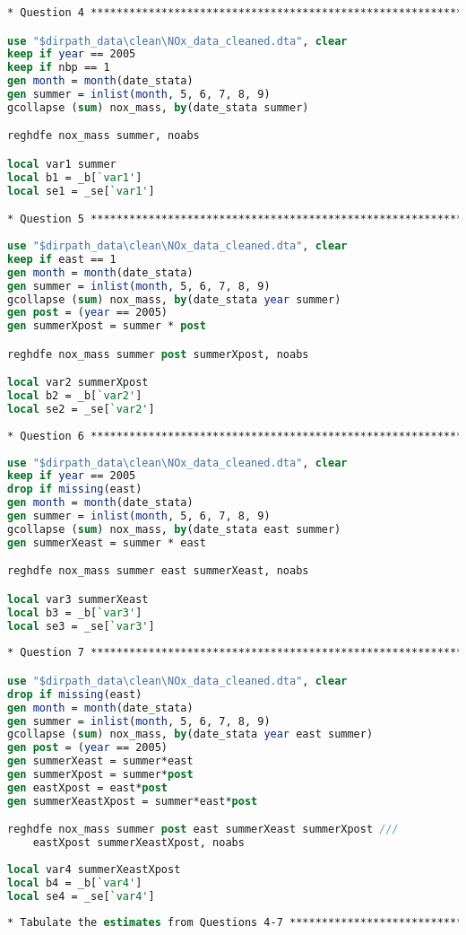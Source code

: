 \documentclass[12pt]{article}
\begin{document}
\begin{lstlisting}[language=Stata, numbers=none]
* Question 4 ***************************************************************

use "$dirpath_data\clean\NOx_data_cleaned.dta", clear
keep if year == 2005 
keep if nbp == 1  
gen month = month(date_stata)
gen summer = inlist(month, 5, 6, 7, 8, 9)
gcollapse (sum) nox_mass, by(date_stata summer)

reghdfe nox_mass summer, noabs

local var1 summer
local b1 = _b[`var1']
local se1 = _se[`var1']

* Question 5 ***************************************************************
	
use "$dirpath_data\clean\NOx_data_cleaned.dta", clear
keep if east == 1 
gen month = month(date_stata)
gen summer = inlist(month, 5, 6, 7, 8, 9)
gcollapse (sum) nox_mass, by(date_stata year summer)
gen post = (year == 2005)
gen summerXpost = summer * post

reghdfe nox_mass summer post summerXpost, noabs

local var2 summerXpost
local b2 = _b[`var2']
local se2 = _se[`var2']
	
* Question 6 ***************************************************************
	
use "$dirpath_data\clean\NOx_data_cleaned.dta", clear
keep if year == 2005
drop if missing(east)
gen month = month(date_stata)
gen summer = inlist(month, 5, 6, 7, 8, 9)
gcollapse (sum) nox_mass, by(date_stata east summer)
gen summerXeast = summer * east

reghdfe nox_mass summer east summerXeast, noabs

local var3 summerXeast
local b3 = _b[`var3']
local se3 = _se[`var3']
	
* Question 7 ***************************************************************

use "$dirpath_data\clean\NOx_data_cleaned.dta", clear
drop if missing(east)
gen month = month(date_stata)
gen summer = inlist(month, 5, 6, 7, 8, 9)
gcollapse (sum) nox_mass, by(date_stata year east summer)
gen post = (year == 2005)
gen summerXeast = summer*east 
gen summerXpost = summer*post 
gen eastXpost = east*post
gen summerXeastXpost = summer*east*post 

reghdfe nox_mass summer post east summerXeast summerXpost ///
	eastXpost summerXeastXpost, noabs
	
local var4 summerXeastXpost
local b4 = _b[`var4']
local se4 = _se[`var4']
	
* Tabulate the estimates from Questions 4-7 **********************************
	

\end{lstlisting}
\end{document}
